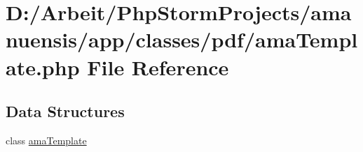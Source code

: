 \hypertarget{a00094}{}\section{D\+:/\+Arbeit/\+Php\+Storm\+Projects/amanuensis/app/classes/pdf/ama\+Template.php File Reference}
\label{a00094}
\subsection*{Data Structures}
\begin{DoxyCompactItemize}
\item 
class \hyperlink{a00011}{ama\+Template}
\end{DoxyCompactItemize}
